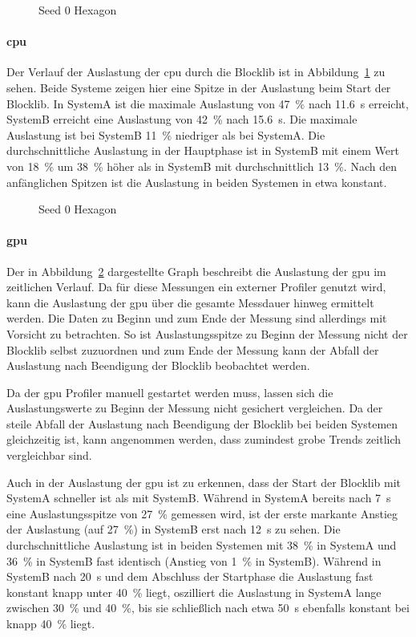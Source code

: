 \begin{figure}[!htbp]
	\caption{Seed 0 Hexagon}\label{fig:seed-0-hexagon-cpu}
\end{figure}
\paragraph{\ac{cpu}} Der Verlauf der Auslastung der \ac{cpu} durch die Blocklib ist in Abbildung~\ref{fig:seed-0-hexagon-cpu} zu sehen. Beide Systeme zeigen hier eine Spitze in der Auslastung beim Start der Blocklib. In SystemA ist die maximale Auslastung von \SI{47}{\percent} nach \SI{11,6}{\second} erreicht, SystemB erreicht eine Auslastung von \SI{42}{\percent} nach \SI{15,6}{\second}. Die maximale Auslastung ist bei SystemB \SI{11}{\percent} niedriger als bei SystemA. Die durchschnittliche Auslastung in der Hauptphase ist in SystemB mit einem Wert von \SI{18}{\percent} um \SI{38}{\percent} höher als in SystemB mit durchschnittlich \SI{13}{\percent}. Nach den anfänglichen Spitzen ist die Auslastung in beiden Systemen in etwa konstant.

\begin{figure}[!htbp]
	\caption{Seed 0 Hexagon}\label{fig:seed-0-hexagon-gpu}
\end{figure}
\paragraph{\ac{gpu}} Der in Abbildung~\ref{fig:seed-0-hexagon-gpu} dargestellte Graph beschreibt die Auslastung der \ac{gpu} im zeitlichen Verlauf. Da für diese Messungen ein externer Profiler genutzt wird, kann die Auslastung der \ac{gpu} über die gesamte Messdauer hinweg ermittelt werden. Die Daten zu Beginn und zum Ende der Messung sind allerdings mit Vorsicht zu betrachten. So ist Auslastungsspitze zu Beginn der Messung nicht der Blocklib selbst zuzuordnen und zum Ende der Messung kann der Abfall der Auslastung nach Beendigung der Blocklib beobachtet werden. 

Da der \ac{gpu} Profiler manuell gestartet werden muss, lassen sich die Auslastungswerte zu Beginn der Messung nicht gesichert vergleichen. Da der steile Abfall der Auslastung nach Beendigung der Blocklib bei beiden Systemen gleichzeitig ist, kann angenommen werden, dass zumindest grobe Trends zeitlich vergleichbar sind.

Auch in der Auslastung der \ac{gpu} ist zu erkennen, dass der Start der Blocklib mit SystemA schneller ist als mit SystemB. Während in SystemA bereits nach \SI{7}{\second} eine Auslastungsspitze von \SI{27}{\percent} gemessen wird, ist der erste markante Anstieg der Auslastung (auf \SI{27}{\percent}) in SystemB  erst nach \SI{12}{\second} zu sehen. Die durchschnittliche Auslastung ist in beiden Systemen mit \SI{38}{\percent} in SystemA und \SI{36}{\percent} in SystemB fast identisch (Anstieg von \SI{1}{\percent} in SystemB). Während in SystemB nach \SI{20}{\second} und dem Abschluss der Startphase die Auslastung fast konstant knapp unter \SI{40}{\percent} liegt, oszilliert die Auslastung in SystemA lange zwischen \SI{30}{\percent} und \SI{40}{\percent}, bis sie schließlich nach etwa \SI{50}{\second} ebenfalls konstant bei knapp \SI{40}{\percent} liegt.

